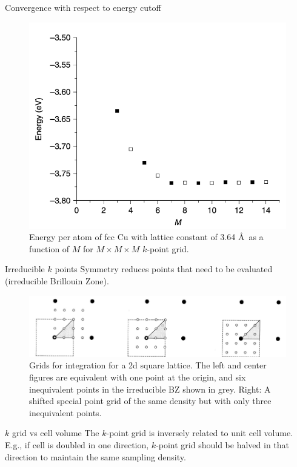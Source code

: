 \documentclass[aspectratio=169]{beamer}
\begin{document}
\begin{frame}{Convergence with respect to energy cutoff}
\begin{figure}
    \centering
    \includegraphics[width=0.4\linewidth]{lectures/figures/7_convergence_kpoint.png}
    \caption{Energy per atom of fcc Cu with lattice constant of 3.64 \AA~as a function of $M$ for $M \times M \times M$ $k$-point grid.\cite{shollDensityFunctionalTheory2009}}
\end{figure} 
\end{frame} 


\begin{frame}{Irreducible $k$ points}
Symmetry reduces points that need to be evaluated (irreducible Brillouin Zone).
\begin{figure}
    \centering
    \includegraphics[width=0.6\linewidth]{lectures/figures/7_irr_BZ.png}
    \caption{Grids for integration for a 2d square lattice. The left and center figures are equivalent with one point at the origin, and six inequivalent points in the irreducible BZ shown in grey. Right: A shifted special point grid of the same density but with only three inequivalent points. \cite{shollDensityFunctionalTheory2009}}
\end{figure} 
\begin{alertblock}{$k$ grid vs cell volume}
    The $k$-point grid is inversely related to unit cell volume. E.g., if cell is doubled in one direction, $k$-point grid should be halved in that direction to maintain the same sampling density.
\end{alertblock}

\end{frame} 
\end{document}
